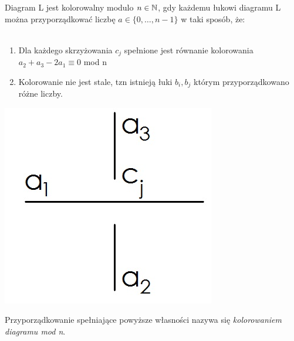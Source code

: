 \begin{definicja}
Diagram L jest kolorowalny modulo $n \in \mathbb N$, gdy każdemu łukowi diagramu L można przyporządkować liczbę $a \in \lbrace 0, \ldots, n-1 \rbrace$ w taki sposób, że: \\ \\
	\begin{minipage}{0.7\textwidth}
	
	\begin{enumerate}
		\item Dla każdego skrzyżowania $c_{j}$ spełnione jest równanie kolorowania \\ $a_{2}+a_{3}-2a_{1} \equiv 0$ mod n
		\item Kolorowanie nie jest stale, tzn istnieją łuki $b_{i}, b_{j}$ którym 			przyporządkowano różne liczby.
		 
	\end{enumerate}
	\end{minipage}
	\begin{minipage}{0.3\textwidth}
	\begin{center}

	\includegraphics[scale=0.35]{2/Obrazy/Crossing1}
	\end{center}
	\end{minipage}
\end{definicja}
Przyporządkowanie spełniające powyższe własności nazywa się \emph{kolorowaniem diagramu mod n}.




